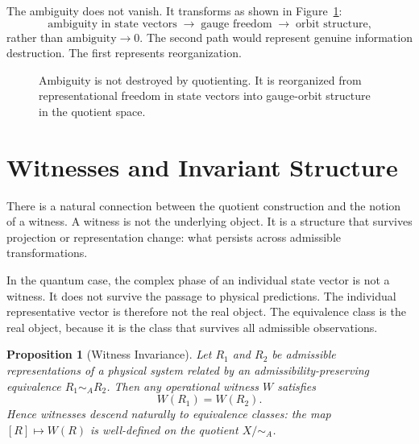 \documentclass[12pt]{article}
\newtheorem{proposition}[theorem]{Proposition}
\begin{document}
The ambiguity does not vanish. It transforms as shown in Figure~\ref{fig:ambiguity}:
\[
\text{ambiguity in state vectors}
\;\longrightarrow\;
\text{gauge freedom}
\;\longrightarrow\;
\text{orbit structure,}
\]
rather than $\text{ambiguity} \rightarrow 0$. The second path would represent genuine information destruction. The first represents reorganization.

\begin{figure}[ht]
\centering
{}
\caption{Ambiguity is not destroyed by quotienting. It is reorganized from
representational freedom in state vectors into gauge-orbit structure in the
quotient space.}
\label{fig:ambiguity}
\end{figure}

\section{Witnesses and Invariant Structure}

There is a natural connection between the quotient construction and the notion of a witness. A witness is not the underlying object. It is a structure that survives projection or representation change: what persists across admissible transformations.

In the quantum case, the complex phase of an individual state vector is not a witness. It does not survive the passage to physical predictions. The individual representative vector is therefore not the real object. The equivalence class is the real object, because it is the class that survives all admissible observations.

\begin{proposition}[Witness Invariance]
\label{prop:witness-inv}
Let $R_1$ and $R_2$ be admissible representations of a physical system related by an admissibility-preserving equivalence $R_1 \sim_A R_2$. Then any operational witness $W$ satisfies
\[
W(R_1) = W(R_2).
\]
Hence witnesses descend naturally to equivalence classes: the map $[R] \mapsto W(R)$ is well-defined on the quotient $X / {\sim_A}$.
\end{proposition}
\end{document}
